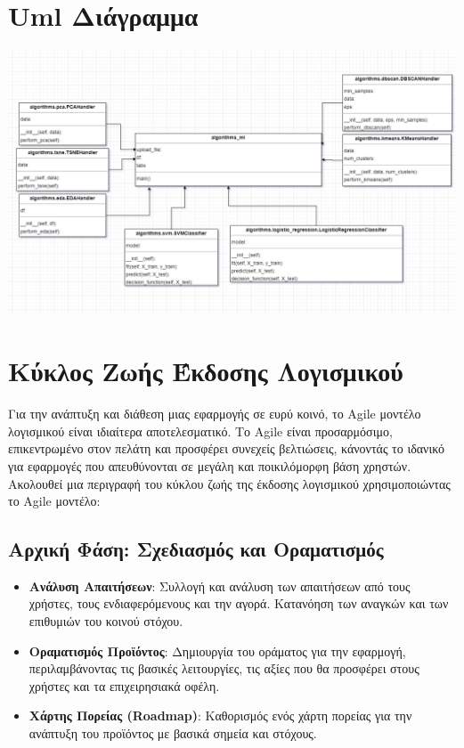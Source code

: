 \documentclass{article}
\begin{document}
\section{Uml Διάγραμμα}
\includegraphics[width=1.0\linewidth]{uml_diagram.png}

\section{Κύκλος Ζωής Έκδοσης Λογισμικού}
Για την ανάπτυξη και διάθεση μιας εφαρμογής σε ευρύ κοινό, το Agile μοντέλο λογισμικού είναι ιδιαίτερα αποτελεσματικό. Το Agile είναι προσαρμόσιμο, επικεντρωμένο στον πελάτη και προσφέρει συνεχείς βελτιώσεις, κάνοντάς το ιδανικό για εφαρμογές που απευθύνονται σε μεγάλη και ποικιλόμορφη βάση χρηστών. Ακολουθεί μια περιγραφή του κύκλου ζωής της έκδοσης λογισμικού χρησιμοποιώντας το Agile μοντέλο:
\subsection{Αρχική Φάση: Σχεδιασμός και Οραματισμός}
\begin{itemize}
    \item \textbf{Ανάλυση Απαιτήσεων}: Συλλογή και ανάλυση των απαιτήσεων από τους χρήστες, τους ενδιαφερόμενους και την αγορά. Κατανόηση των αναγκών και των επιθυμιών του κοινού στόχου.
    \item \textbf{Οραματισμός Προϊόντος}: Δημιουργία του οράματος για την εφαρμογή, περιλαμβάνοντας τις βασικές λειτουργίες, τις αξίες που θα προσφέρει στους χρήστες και τα επιχειρησιακά οφέλη.
    \item \textbf{Χάρτης Πορείας (Roadmap)}: Καθορισμός ενός χάρτη πορείας για την ανάπτυξη του προϊόντος με βασικά σημεία και στόχους.
\end{itemize}
% 
\end{document}
